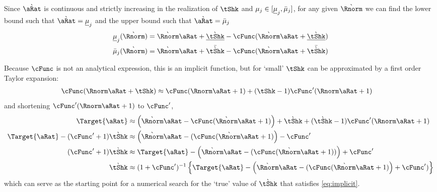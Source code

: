 \documentclass[\econtexRoot/BufferStockTheory.tex]{subfiles}
\begin{document}
Since $\Nxt{\pnt}$ is continuous and strictly increasing in the realization of $\tShk$ and $\mu_{j} \in [\underline{\mu}_{j},\bar{\mu}_{j}]$, for any given $\Nxt{\Rnorm}$ we can find the lower bound such that ${\Nxt{\pnt}}=\Bot{\SetPartCnts}_{\thatBin}$ and the upper bound such that ${\Nxt{\pnt}}=\Top{\SetPartCnts}_{\thatBin}$
\begin{align}
  \Bot{\SetPartCnts}_{\thatBin}(\Nxt{\Rnorm}) & =  \Nxt{\Rnorm} \pnt + \Bot{\Nxt{\tShk}} - \cFunc(\Nxt{\Rnorm}\pnt+\Bot{\Nxt{\tShk}})
  \\  \Top{\SetPartCnts}_{\thatBin}(\Nxt{\Rnorm}) & =  \Nxt{\Rnorm} \pnt + \Top{\Nxt{\tShk}} - \cFunc(\Nxt{\Rnorm}\pnt+\Top{\Nxt{\tShk}})
\end{align}

\begin{comment}
  For any given current value $\pnt$ (and treating $\Nxt{\DnsShk}$ and $\Nxt{\Rnorm}=\Rfree (\PGro \Nxt{\DnsShk})^{-1}$ as predetermined).
  \begin{align}
    \Target{\pnt}(\tShk) & = 
                           \Nxt{\Rnorm} \pnt + \Nxt{\tShk} - \cFunc(\Nxt{\Rnorm}\pnt+\Nxt{\tShk})
                           \label{eq:implicit}
  \end{align}
\end{comment}
Because $\cFunc$ is not an analytical expression, this is an implicit function, but for `small' $\tShk$ can be approximated by
a first order Taylor expansion:
\begin{align}
  \cFunc(\Rnorm \pnt + \tShk) & \approx   \cFunc(\Rnorm \pnt + 1)+ (\tShk-1)\cFunc^{\prime}(\Rnorm \pnt + 1)
\end{align}
and shortening $\cFunc^{\prime}(\Rnorm \pnt + 1)$ to $\cFunc^{\prime}$,
\begin{align}
  \Target{\pnt} & \approx \left(
                  \Nxt{\Rnorm} \pnt  - \cFunc(\Nxt{\Rnorm}\pnt+1)
                  \right)
                  +\Nxt{\tShk}+(\Nxt{\tShk}-1)\cFunc^{\prime}(\Rnorm \pnt + 1)
  \\ \Target{\pnt} -(\cFunc^{\prime}+1)\Nxt{\tShk} & \approx  \left(\Nxt{\Rnorm} \pnt  - (\cFunc(\Nxt{\Rnorm}\pnt+1)\right)-\cFunc^{\prime}
  \\  (\cFunc^{\prime}+1)\Nxt{\tShk} & \approx \Target{\pnt}- \left(\Nxt{\Rnorm} \pnt  - (\cFunc(\Nxt{\Rnorm}\pnt+1))\right)+\cFunc^{\prime}                                             \\  \Nxt{\tShk} & \approx  (1+\cFunc^{\prime})^{-1}\left\{\Target{\pnt}- \left(\Nxt{\Rnorm} \pnt  - (\cFunc(\Nxt{\Rnorm}\pnt+1)\right)+\cFunc^{\prime})\right\}
\end{align}
which can serve as the starting point for a numerical search for the `true' value of $\Nxt{\tShk}$ that satisfies \eqref{eq:implicit}.
\end{document}
